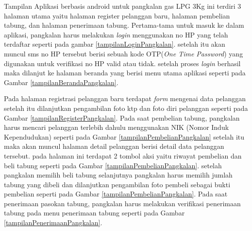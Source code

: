 	\par Tampilan Aplikasi berbasis android untuk pangkalan gas LPG 3Kg ini terdiri 3 halaman utama yaitu halaman register pelanggan baru, halaman pembelian tabung, dan halaman penerimaan tabung. Pertama-tama untuk masuk ke dalam aplikasi, pangkalan harus melakukan \textit{login} menggunakan no HP yang telah terdaftar seperti pada gambar \ref{tampilanLoginPangkalan}. setelah itu akan muncul sms no HP tersebut berisi sebuah kode OTP(\textit{One Time Password}) yang digunakan untuk verifikasi no HP valid atau tidak. setelah proses \textit{login} berhasil maka dilanjut ke halaman beranda yang berisi menu utama aplikasi seperti pada Gambar \ref{tampilanBerandaPangkalan}.
	\par Pada halaman registrasi pelanggan baru terdapat \textit{form} mengenai data pelanggan setelah itu dilanjutkan pengambilan foto ktp dan foto diri pelanggan seperti pada Gambar \ref{tampilanRegisterPangkalan}. Pada saat pembelian tabung, pangkalan harus mencari pelanggan terlebih dahulu menggunakan NIK (Nomor Induk Kependudukan) seperti pada Gambar \ref{tampilanPembelianPangkalan} setelah itu maka akan muncul halaman detail pelanggan berisi detail data pelanggan tersebut. pada halaman ini terdapat 2 tombol aksi yaitu riwayat pembelian dan beli tabung seperti pada Gambar \ref{tampilanPembelianPangkalan}. setelah pangkalan memilih beli tabung selanjutnya pangkalan harus memilih jumlah tabung yang dibeli dan dilanjutkan pengambilan foto pembeli sebagai bukti pembelian seperti pada Gambar \ref{tampilanPembelianPangkalan}. Pada saat penerimaan pasokan tabung, pangkalan harus melakukan verifikasi penerimaan tabung pada menu penerimaan tabung seperti pada Gambar \ref{tampilanPenerimaanPangkalan}.
	
